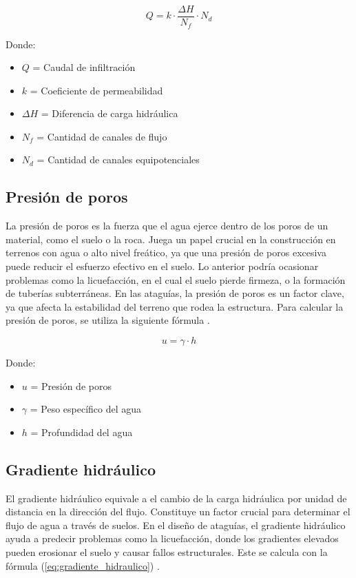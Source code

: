 \begin{equation}
    Q = k \cdot \frac{\Delta H}{N_{f}} \cdot N_{d}
    \label{eq:caudal_infiltracion}
\end{equation}

Donde:
\begin{itemize}
    \item $Q$ = Caudal de infiltración
    \item $k$ = Coeficiente de permeabilidad
    \item $\Delta H$ = Diferencia de carga hidráulica
    \item $N_{f}$ = Cantidad de canales de flujo
    \item $N_{d}$ = Cantidad de canales equipotenciales
\end{itemize}

\subsection{Presión de poros}
La presión de poros es la fuerza que el agua ejerce dentro de los poros de un material, como el suelo o la roca. Juega un papel crucial en la construcción en terrenos con agua o alto nivel freático, ya que una presión de poros excesiva puede reducir el esfuerzo efectivo en el suelo. Lo anterior podría ocasionar problemas como la licuefacción, en el cual el suelo pierde firmeza, o la formación de tuberías subterráneas. En las ataguías, la presión de poros es un factor clave, ya que afecta la estabilidad del terreno que rodea la estructura. Para calcular la presión de poros, se utiliza la siguiente fórmula \cite{jeas}.

\begin{equation}
    u = \gamma \cdot h
    \label{eq:presion_poros}
\end{equation}

Donde:
\begin{itemize}
    \item $u$ = Presión de poros
    \item $\gamma$ = Peso específico del agua
    \item $h$ = Profundidad del agua
\end{itemize}

\subsection{Gradiente hidráulico}
El gradiente hidráulico equivale a el cambio de la carga hidráulica por unidad de distancia en la dirección del flujo. Constituye un factor crucial para determinar el flujo de agua a través de suelos. En el diseño de ataguías, el gradiente hidráulico ayuda a predecir problemas como la licuefacción, donde los gradientes elevados pueden erosionar el suelo y causar fallos estructurales. Este se calcula con la fórmula (\ref{eq:gradiente_hidraulico}) \citep{budhu_soil_2010}.

